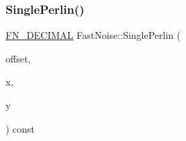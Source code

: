 \subsubsection{\texorpdfstring{Single\+Perlin()}{SinglePerlin()}\hspace{0.1cm}{\footnotesize\ttfamily [1/2]}}
{\footnotesize\ttfamily \mbox{\hyperlink{_fast_noise_8h_a75a9ef6d2541c4921815b885bfd449c3}{F\+N\+\_\+\+D\+E\+C\+I\+M\+AL}} Fast\+Noise\+::\+Single\+Perlin (\begin{DoxyParamCaption}\item[{unsigned char}]{offset,  }\item[{\mbox{\hyperlink{_fast_noise_8h_a75a9ef6d2541c4921815b885bfd449c3}{F\+N\+\_\+\+D\+E\+C\+I\+M\+AL}}}]{x,  }\item[{\mbox{\hyperlink{_fast_noise_8h_a75a9ef6d2541c4921815b885bfd449c3}{F\+N\+\_\+\+D\+E\+C\+I\+M\+AL}}}]{y }\end{DoxyParamCaption}) const\hspace{0.3cm}{\ttfamily [private]}}

